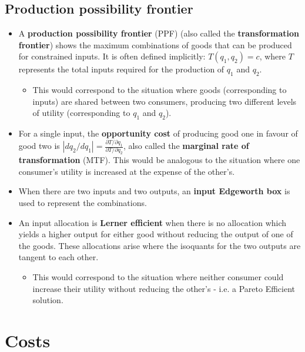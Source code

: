 \documentclass[a4paper]{article}
\begin{document}
\subsection{Production possibility frontier}
\begin{itemize}
    \item A \textbf{production possibility frontier} (PPF) (also called the \textbf{transformation frontier}) shows the maximum combinations of goods that can be produced for constrained inputs. It is often defined implicitly: $T(q_1, q_2) = c$, where $T$ represents the total inputs required for the production of $q_1$ and $q_2$. 
    \begin{itemize}
        \item This would correspond to the situation where goods (corresponding to inputs) are shared between two consumers, producing two different levels of utility (corresponding to $q_1$ and $q_2$).
    \end{itemize}
    \item For a single input, the \textbf{opportunity cost} of producing good one in favour of good two is $| dq_2/dq_1 | = \frac{\partial T / \partial q_1}{\partial T / \partial q_2}$, also called the \textbf{marginal rate of transformation} (MTF). This would be analogous to the situation where one consumer's utility is increased at the expense of the other's.
    \item When there are two inputs and two outputs, an \textbf{input Edgeworth box} is used to represent the combinations. 
    \item An input allocation is \textbf{Lerner efficient} when there is no allocation which yields a higher output for either good without reducing the output of one of the goods. These allocations arise where the isoquants for the two outputs are tangent to each other.
    \begin{itemize}
        \item This would correspond to the situation where neither consumer could increase their utility without reducing the other's - i.e. a Pareto Efficient solution.
    \end{itemize}
\end{itemize}

\section{Costs}
\end{document}
